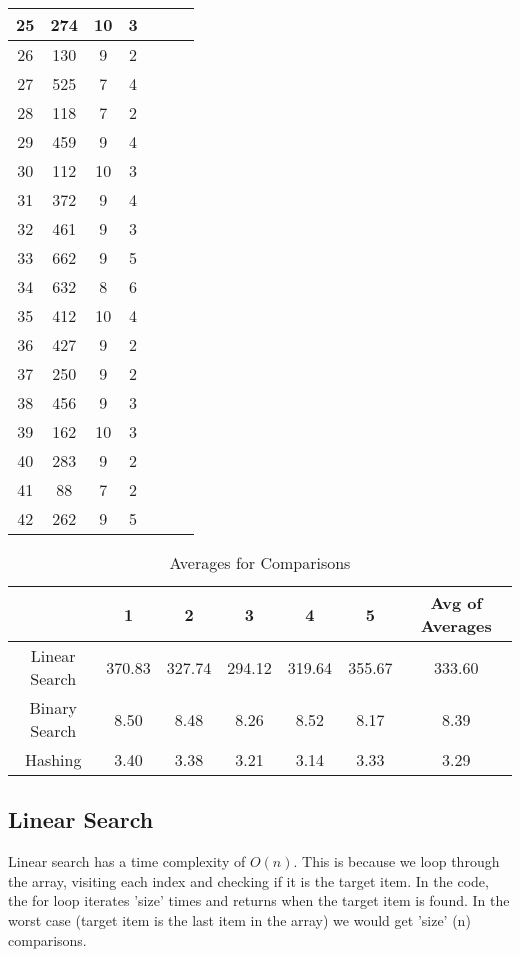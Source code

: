 \documentclass[letterpaper, 10pt,DIV=13]{scrartcl}
\numberwithin{equation}{section} %
\numberwithin{figure}{section} %
\numberwithin{table}{section} %
\begin{document}
\begin{table}[H]
\begin{tabular}{|c|c|c|c|c|c|c|}
\hline
25 & 274 & 10 & 3 \\
\hline
26 & 130 & 9 & 2 \\
\hline
27 & 525 & 7 & 4 \\
\hline
28 & 118 & 7 & 2 \\
\hline
29 & 459 & 9 & 4 \\
\hline
30 & 112 & 10 & 3 \\
\hline
31 & 372 & 9 & 4 \\
\hline
32 & 461 & 9 & 3 \\
\hline
33 & 662 & 9 & 5 \\
\hline
34 & 632 & 8 & 6 \\
\hline
35 & 412 & 10 & 4 \\
\hline
36 & 427 & 9 & 2 \\
\hline
37 & 250 & 9 & 2 \\
\hline
38 & 456 & 9 & 3 \\
\hline
39 & 162 & 10 & 3 \\
\hline
40 & 283 & 9 & 2 \\
\hline
41 & 88 & 7 & 2 \\
\hline
42 & 262 & 9 & 5 \\
\hline
\end{tabular}
\end{table}

\begin{table}[H]
\centering
\caption{Averages for Comparisons}
\begin{tabular}{|c|c|c|c|c|c|c|}
\hline
 & 1 & 2 & 3 & 4 & 5 & Avg of Averages \\
\hline
Linear Search & 370.83 & 327.74 & 294.12 & 319.64 & 355.67 & 333.60 \\
\hline
Binary Search & 8.50 & 8.48 & 8.26 & 8.52 & 8.17 & 8.39 \\
\hline
Hashing & 3.40 & 3.38 & 3.21 & 3.14 & 3.33 & 3.29 \\
\hline
\end{tabular}
\end{table}

\subsection{Linear Search}
Linear search has a time complexity of $O(n)$. This is because we loop through the array, visiting each index and checking if it is the target item. In the code, the for loop iterates 'size' times and returns when the target item is found. In the worst case (target item is the last item in the array) we would get 'size' (n) comparisons.
\end{document}
